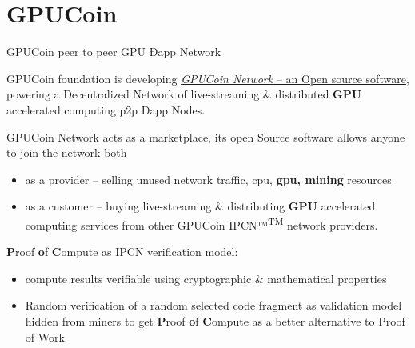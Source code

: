 \documentclass[10pt,handout]{beamer}
\begin{document}
\section{GPUCoin}
\begin{frame}[fragile]{ GPUCoin peer to peer GPU Ðapp Network }

GPUCoin foundation is developing \href{http://gpuco.in/}{\emph{GPUCoin Network} – an Open source software}, powering a Decentralized Network of live-streaming \& distributed \textbf{GPU} accelerated computing p2p Ðapp Nodes.
 
\pause
GPUCoin Network acts as a marketplace, its open Source software allows anyone to join the network both 

\begin{itemize}[<+-| alert@+>]
\item as a provider – selling unused network traffic, cpu, \textbf{gpu, mining} resources
\item as a customer – buying live-streaming \& distributing \textbf{GPU} accelerated computing services from other GPUCoin IPCN™\textsuperscript{TM} network providers. 

\end{itemize}
 \pause
 \textbf{P}roof \textbf{o}f \textbf{C}ompute as IPCN verification model:
 \begin{itemize}[<+-| alert@+>]
  \item compute results verifiable using cryptographic \& mathematical properties
   \item Random verification of a random selected code fragment as validation model hidden from miners to get \textbf{P}roof \textbf{o}f \textbf{C}ompute as a better alternative to Proof of Work

\end{itemize}

\end{frame}


\end{document}
